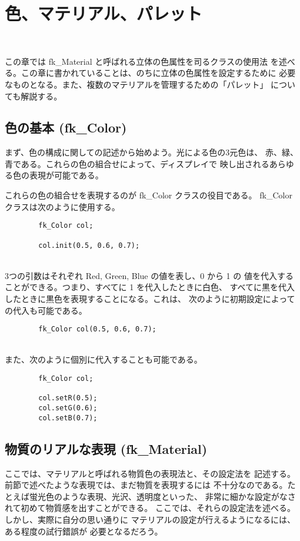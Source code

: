 \chapter{色、マテリアル、パレット} \label{sec:material} ~

この章では fk\_Material と呼ばれる立体の色属性を司るクラスの使用法
を述べる。この章に書かれていることは、のちに立体の色属性を設定するために
必要なものとなる。また、複数のマテリアルを管理するための「パレット」
についても解説する。
\section{色の基本 (fk\_Color)}
まず、色の構成に関しての記述から始めよう。光による色の3元色は、
赤、緑、青である。これらの色の組合せによって、ディスプレイで
映し出されるあらゆる色の表現が可能である。

これらの色の組合せを表現するのが fk\_Color クラスの役目である。
fk\_Color クラスは次のように使用する。
\\
\begin{screen}
\begin{verbatim}
        fk_Color col;

        col.init(0.5, 0.6, 0.7);
\end{verbatim}
\end{screen}
~ \\
3つの引数はそれぞれ Red, Green, Blue の値を表し、0 から 1 の
値を代入することができる。つまり、すべてに 1 を代入したときに白色、
すべてに黒を代入したときに黒色を表現することになる。これは、
次のように初期設定によっての代入も可能である。
\\
\begin{screen}
\begin{verbatim}
        fk_Color col(0.5, 0.6, 0.7);
\end{verbatim}
\end{screen}
~ \\
また、次のように個別に代入することも可能である。
\\
\begin{screen}
\begin{verbatim}
        fk_Color col;

        col.setR(0.5);
        col.setG(0.6);
        col.setB(0.7);
\end{verbatim}
\end{screen}
\section{物質のリアルな表現 (fk\_Material)}
ここでは、マテリアルと呼ばれる物質色の表現法と、その設定法を
記述する。前節で述べたような表現では、まだ物質を表現するには
不十分なのである。たとえば蛍光色のような表現、光沢、透明度といった、
非常に細かな設定がなされて初めて物質感を出すことができる。
ここでは、それらの設定法を述べる。しかし、実際に自分の思い通りに
マテリアルの設定が行えるようになるには、ある程度の試行錯誤が
必要となるだろう。

